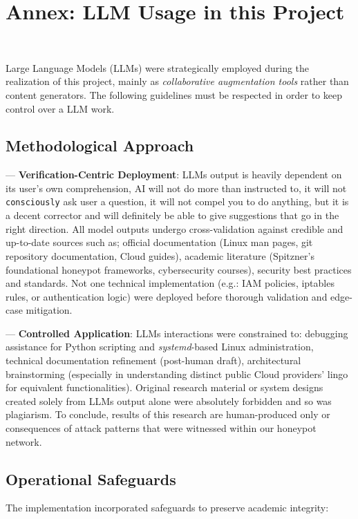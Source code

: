 \newpage

\newpage 


\section{Annex: LLM Usage in this Project}  
\label{annex:llm}  
\
\

Large Language Models (LLMs) were strategically employed during the realization of this project, mainly as \emph{collaborative augmentation tools} rather than content generators. The following guidelines must be respected in order to keep control over a LLM work.
\subsection*{Methodological Approach}

--- \textbf{Verification-Centric Deployment}: LLMs output is heavily dependent on its user's own comprehension, AI will not do more than instructed to, it will not \texttt{consciously} ask user a question, it will not compel you to do anything, but it is a decent corrector and will definitely be able to give suggestions that go in the right direction. All model outputs undergo cross-validation against credible and up-to-date sources such as; official documentation (Linux man pages, git repository documentation, Cloud guides), academic literature (Spitzner's foundational honeypot frameworks, cybersecurity courses), security best practices and standards. Not one technical implementation (e.g.: IAM policies, iptables rules, or authentication logic) were deployed before thorough validation and edge-case mitigation.

--- \textbf{Controlled Application}: LLMs interactions were constrained to: debugging assistance for Python scripting and \textit{systemd}-based Linux administration, technical documentation refinement (post-human draft), architectural brainstorming (especially in understanding distinct public Cloud providers' lingo for equivalent functionalities). Original research material or system designs created solely from LLMs output alone were absolutely forbidden and so was plagiarism. To conclude, results of this research are human-produced only or consequences of attack patterns that were witnessed within our honeypot network.

\subsection*{Operational Safeguards}
The implementation incorporated safeguards to preserve academic integrity:

